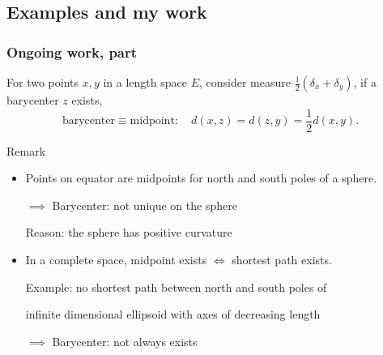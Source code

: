 \documentclass[aspectratio=169]{beamer}
\begin{document}
\subsection{Examples and my work}
\begin{frame}
	\frametitle{Ongoing work, part }
	\begin{example}
		For two points $x,y$ in a length space $E$, consider measure $\frac{1}{2}(\delta_x + \delta_y)$, if a barycenter $z$ exists,
		\[
			\text{barycenter} \equiv \text{midpoint}:\quad d(x, z) = d(z, y) = \frac{1}{2} d(x,y).
		\]
	\end{example}
	\pause
	\begin{block}{Remark}
		\begin{itemize}
			\item Points on equator are midpoints for north and south poles of a sphere. \pause

			      $\implies$ Barycenter: \alert{not unique} on the sphere \pause

			      \hspace{3.6em} Reason: the sphere has positive curvature  \pause


			\item In a complete space, midpoint exists $\iff$ shortest path exists.\pause

			      Example: no shortest path between north and south poles of

			      infinite dimensional ellipsoid with axes of decreasing length \pause

			      $\implies$ Barycenter: \alert{not always exists}
		\end{itemize}
	\end{block}
\end{frame}
\end{document}
